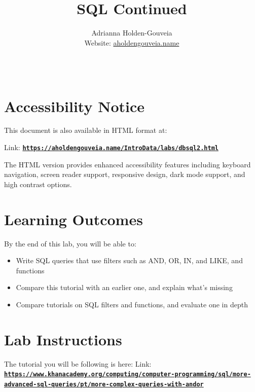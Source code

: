 \documentclass[12pt]{article}
\title{SQL Continued}
\author{
        Adrianna Holden-Gouveia \\
        Website: \href{https://aholdengouveia.name}{aholdengouveia.name}\\ 
        \date{\vspace{-5ex}}
        \faGithub {: aholdengouveia} \\
        }
\begin{document}
    

\maketitle



\section*{Accessibility Notice}
This document is also available in HTML format at:

Link: \href{https://aholdengouveia.name/IntroData/labs/dbsql2.html}{\textbf{\nolinkurl{https://aholdengouveia.name/IntroData/labs/dbsql2.html}}}

The HTML version provides enhanced accessibility features including keyboard navigation, screen reader support, responsive design, dark mode support, and high contrast options.

\section*{Learning Outcomes}
By the end of this lab, you will be able to:
\begin{itemize}
    \item Write SQL queries that use filters such as AND, OR, IN, and LIKE, and functions
    \item Compare this tutorial with an earlier one, and explain what's missing
    \item Compare tutorials on SQL filters and functions, and evaluate one in depth
\end{itemize}

\section*{Lab Instructions}


The tutorial you will be following is here: Link: \href{https://www.khanacademy.org/computing/computer-programming/sql/more-advanced-sql-queries/pt/more-complex-queries-with-andor}{\textbf{\nolinkurl{https://www.khanacademy.org/computing/computer-programming/sql/more-advanced-sql-queries/pt/more-complex-queries-with-andor}}} 
\end{document}

